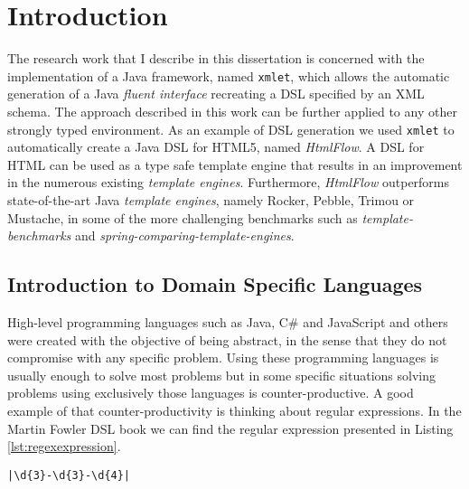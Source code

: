 \chapter{Introduction}
\label{cha:introduction}

The research work that I describe in this dissertation is concerned with the implementation of a Java framework, named \texttt{xmlet}, which allows the automatic generation of a Java \textit{fluent interface}\cite{fluentinterface} recreating a \ac{DSL}\cite{dsl} specified by an \ac{XML} schema. The approach described in this work can be further applied to any other strongly typed environment. As an example of \ac{DSL} generation we used \texttt{xmlet} to automatically create a Java \ac{DSL} for \ac{HTML}5, named \textit{HtmlFlow}\cite{htmlflow}. A \ac{DSL} for \ac{HTML} can be used as a type safe template engine that results in an improvement in the numerous existing \textit{template engines}. Furthermore, \textit{HtmlFlow} outperforms state-of-the-art Java \textit{template engines}, namely Rocker\cite{rocker}, Pebble\cite{pebble}, Trimou\cite{trimou} or Mustache\cite{mustache}, in some of the more challenging benchmarks such as \textit{template-benchmarks}\cite{templatebenchmark} and \textit{spring-comparing-template-engines}\cite{springbenchmark}.

\section{Introduction to Domain Specific Languages}


High-level programming languages such as Java, C\# and JavaScript and others were created with the objective of being abstract, in the sense that they do not compromise with any specific problem. Using these programming languages is usually enough to solve most problems but in some specific situations solving problems using exclusively those languages is counter-productive. A good example of that counter-productivity is thinking about regular expressions. In the Martin Fowler \ac{DSL} book\cite{dslbook} we can find the regular expression presented in Listing \ref{lst:regexexpression}.

\bigskip

\begin{minipage}{\linewidth}
\begin{lstlisting}[caption={Regular Expression Example}, label={lst:regexexpression}, style=dynamicviewsex]
|\d{3}-\d{3}-\d{4}|
\end{lstlisting}
\end{minipage} 

